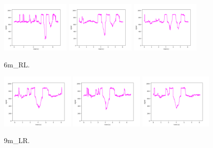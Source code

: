 \begin{figure}[!ht]
\begin{center}
\includegraphics[width=0.3\textwidth]{../data/6m_RL/6m_RL_1.png}
\includegraphics[width=0.3\textwidth]{../data/6m_RL/6m_RL_2.png}
\includegraphics[width=0.3\textwidth]{../data/6m_RL/6m_RL_3.png}
\caption{6m\_RL.\label{fig:6m_RL}}
\end{center}
\end{figure}


\begin{figure}[!ht]
\begin{center}
\includegraphics[width=0.32\textwidth]{../data/9m_LR/9m_LR_1.png}
\includegraphics[width=0.32\textwidth]{../data/9m_LR/9m_LR_2.png}
\includegraphics[width=0.32\textwidth]{../data/9m_LR/9m_LR_3.png}
\caption{9m\_LR.\label{fig:9m_LR}}
\end{center}
\end{figure}

